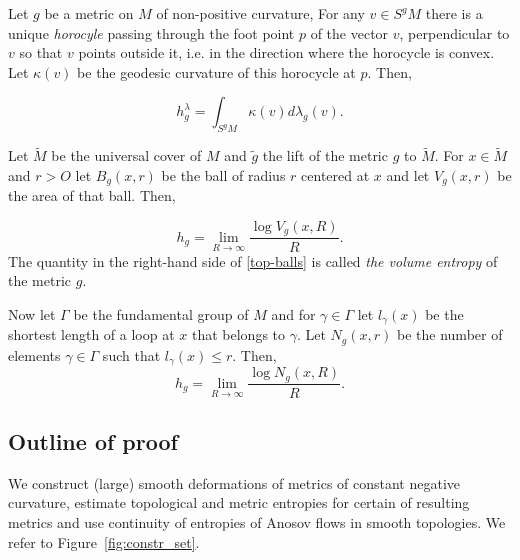 \documentclass[12pt]{article}
\numberwithin{equation}{section}
\theoremstyle{definition}
\begin{document}
  Let $g$ be a metric on $M$ of non-positive curvature, For any $v\in S^gM$ there is a unique {\em horocyle} passing through  the foot point $p$ of the vector $v$, perpendicular to $v$  so that $v$ points outside it, i.e. in the direction where the horocycle is convex. Let $\kappa(v)$ be the geodesic  curvature of this horocycle at $p$. Then, 

\begin{equation}\label{me-horocycle}
h_g^{\lambda}=\int_{S^{g}M}\kappa(v)d\lambda_g(v).
\end{equation}
 \bigskip

Let $\tilde M$ be the universal cover of $M$ and $\tilde g$ the lift of the metric $g$ to $\tilde M$. 
For $x\in \tilde M$ and $r> O$  let $B_g(x,r)$ be the ball of radius $r$  centered at $x$ and let 
$V_g(x,r)$ be the area of that ball. Then,

\begin{equation}\label{top-balls}
h_g=\lim_{R\to\infty}\frac{\log V_g(x,R)}{R}.
\end{equation}
The quantity in the right-hand side of \eqref{top-balls} is called {\em the volume entropy} of the metric $g$. 

Now let $\Gamma$ be the fundamental group of $M$  and for $\gamma\in\Gamma$ let $l_\gamma(x)$ be the shortest length of a loop at $x$ that belongs to $\gamma$.  Let  $N_g(x,r)$ be the number of elements  $\gamma\in\Gamma$ such that $l_\gamma(x)\le r$. Then, 
\begin{equation}\label{top-fundamental}
h_g=\lim_{R\to\infty}\frac{\log N_g(x,R)}{R}.
\end{equation}

\subsection {Outline of  proof}

We construct (large) smooth deformations of metrics of constant negative curvature, estimate topological and metric entropies for certain of resulting metrics and use continuity of entropies of Anosov flows in smooth topologies. We refer to Figure~\ref{fig:constr_set}. 
\end{document}
